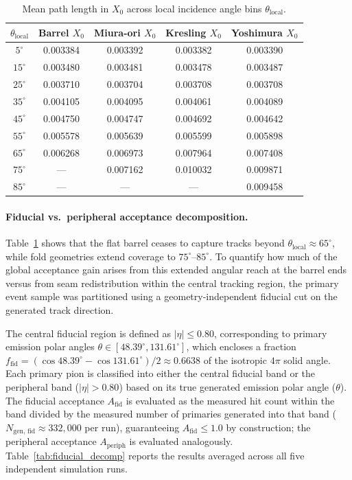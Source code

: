 \documentclass[a4paper,11pt]{article}
\begin{document}
\begin{table}[!htbp]
\centering
\caption{Mean path length in $X_0$ across local incidence angle bins $\theta_{\text{local}}$.}
\label{tab:incidence_angle}
\smallskip
\begin{tabular}{ccccc}
\toprule
$\theta_{\text{local}}$ & Barrel $X_0$ & Miura-ori $X_0$ & Kresling $X_0$ & Yoshimura $X_0$ \\
\midrule
$5^\circ$  & 0.003384 & 0.003392 & 0.003382 & 0.003390 \\
$15^\circ$ & 0.003480 & 0.003481 & 0.003478 & 0.003487 \\
$25^\circ$ & 0.003710 & 0.003704 & 0.003708 & 0.003708 \\
$35^\circ$ & 0.004105 & 0.004095 & 0.004061 & 0.004089 \\
$45^\circ$ & 0.004750 & 0.004747 & 0.004692 & 0.004642 \\
$55^\circ$ & 0.005578 & 0.005639 & 0.005599 & 0.005898 \\
$65^\circ$ & 0.006268 & 0.006973 & 0.007964 & 0.007408 \\
$75^\circ$ & ---       & 0.007162 & 0.010032 & 0.009871 \\
$85^\circ$ & ---       & ---       & ---       & 0.009458 \\
\bottomrule
\end{tabular}
\end{table}

\paragraph{Fiducial vs.\ peripheral acceptance decomposition.}
Table~\ref{tab:incidence_angle} shows that the flat barrel ceases to capture tracks beyond $\theta_{\text{local}} \approx 65^\circ$, while fold geometries extend coverage to $75^\circ$--$85^\circ$. To quantify how much of the global acceptance gain arises from this extended angular reach at the barrel ends versus from seam redistribution within the central tracking region, the primary event sample was partitioned using a geometry-independent fiducial cut on the generated track direction.

The central fiducial region is defined as $|\eta| \le 0.80$, corresponding to primary emission polar angles $\theta \in [48.39^\circ, 131.61^\circ]$, which encloses a fraction $f_{\text{fid}} = (\cos 48.39^\circ - \cos 131.61^\circ)/2 \approx 0.6638$ of the isotropic $4\pi$ solid angle. Each primary pion is classified into either the central fiducial band or the peripheral band ($|\eta| > 0.80$) based on its true generated emission polar angle ($\theta$). The fiducial acceptance $A_{\text{fid}}$ is evaluated as the measured hit count within the band divided by the measured number of primaries generated into that band ($N_{\text{gen, fid}} \approx 332{,}000$ per run), guaranteeing $A_{\text{fid}} \le 1.0$ by construction; the peripheral acceptance $A_{\text{periph}}$ is evaluated analogously. Table~\ref{tab:fiducial_decomp} reports the results averaged across all five independent simulation runs.
\end{document}
